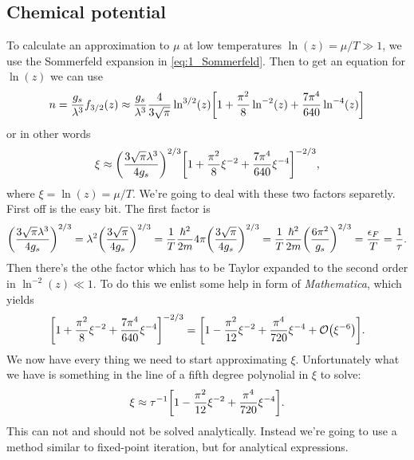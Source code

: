 \documentclass[11pt,letter, swedish, english
]{article}
\begin{document}
\subsection{Chemical potential}
To calculate an approximation to $\mu$ at low temperatures
$\ln(z)=\mu/T\gg1$, we use the Sommerfeld expansion in
\eqref{eq:1_Sommerfeld}. 
Then to get an equation for $\ln(z)$ we can use
\begin{equation}
n=\frac{g_s}{\lambda^3}f_{3/2}(z)
\approx\frac{g_s}{\lambda^3}
\frac{4}{3\sqrt{\pi}}\ln^{3/2}(z)
\qty[1+\frac{\pi^2}{8}\ln^{-2}(z) 
+\frac{7\pi^4}{640}\ln^{-4}(z) ]
\end{equation}
or in other words
\begin{equation}
\xi\approx\qty(\frac{3\sqrt{\pi}\lambda^3}{4g_s})^{2/3}
\qty[1+\frac{\pi^2}{8}\xi^{-2}
+\frac{7\pi^4}{640}\xi^{-4} ]^{-2/3},
\end{equation}
where $\xi=\ln(z)=\mu/T$.
We're going to deal with these two factors separetly.
First off is the easy bit. The first factor is
\begin{equation}
\qty(\frac{3\sqrt{\pi}\lambda^3}{4g_s})^{2/3}
=\lambda^2\qty(\frac{3\sqrt{\pi}}{4g_s})^{2/3}
=\frac{1}{T}\frac{\hbar^2}{2m}4\pi\qty(\frac{3\sqrt{\pi}}{4g_s})^{2/3}
=\frac{1}{T}\frac{\hbar^2}{2m}\qty(\frac{6\pi^2}{g_s})^{2/3}
=\frac{\epsilon_F}{T}=\frac{1}{\tau}.
\end{equation}
Then there's the othe factor which has to be Taylor expanded to the
second order in $\ln^{-2}(z)\ll1$. To do this we enlist some help in
form of \emph{Mathematica}\footnotemark{}, which yields
\begin{equation}
\qty[1 + \frac{\pi^2}{8}\xi^{-2}
 + \frac{7\pi^4}{640}\xi^{-4}]^{-2/3} 
=\qty[1 - \frac{\pi^2}{12}\xi^{-2}
 + \frac{\pi^4}{720}\xi^{-4} + \order{\xi^{-6}}].
\end{equation}
We now have every thing we need to start approximating $\xi$.
Unfortunately what we have is something in the line of a fifth degree
polynolial in $\xi$ to solve: 
\begin{equation}\label{eq:2_fixed-point}
\xi\approx \tau^{-1}\qty[1 - \frac{\pi^2}{12}\xi^{-2}
 + \frac{\pi^4}{720}\xi^{-4}].
\end{equation}
This can not and should not be solved
analytically. Instead we're going to use a method similar to
fixed-point iteration, but for analytical expressions.
\end{document}
